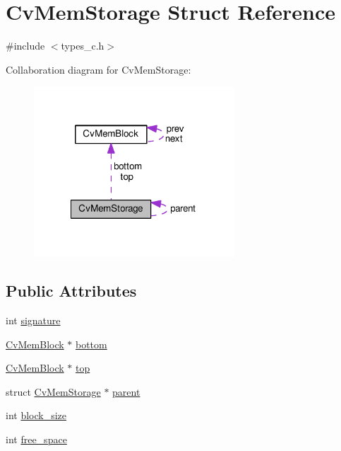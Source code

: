 \hypertarget{structCvMemStorage}{\section{Cv\-Mem\-Storage Struct Reference}
\label{structCvMemStorage}
}


{\ttfamily \#include $<$types\-\_\-c.\-h$>$}



Collaboration diagram for Cv\-Mem\-Storage\-:\nopagebreak
\begin{figure}[H]
\begin{center}
\leavevmode
\includegraphics[width=213pt]{structCvMemStorage__coll__graph}
\end{center}
\end{figure}
\subsection*{Public Attributes}
\begin{DoxyCompactItemize}
\item 
int \hyperlink{structCvMemStorage_ad6cff87c874de298f27b1f7599795cdd}{signature}
\item 
\hyperlink{structCvMemBlock}{Cv\-Mem\-Block} $\ast$ \hyperlink{structCvMemStorage_a2cdac5680dfa6687e53d3e694a328d61}{bottom}
\item 
\hyperlink{structCvMemBlock}{Cv\-Mem\-Block} $\ast$ \hyperlink{structCvMemStorage_ae68336bd5602675740211f0320fe992b}{top}
\item 
struct \hyperlink{structCvMemStorage}{Cv\-Mem\-Storage} $\ast$ \hyperlink{structCvMemStorage_a42c4f6ed6f03bdda8fd46a9edc3ae13a}{parent}
\item 
int \hyperlink{structCvMemStorage_ac9b161be5f7c94fd6bd2515df0ea70f0}{block\-\_\-size}
\item 
int \hyperlink{structCvMemStorage_a67a2a5803a0eed924d3d0f3dc91fe811}{free\-\_\-space}
\end{DoxyCompactItemize}


